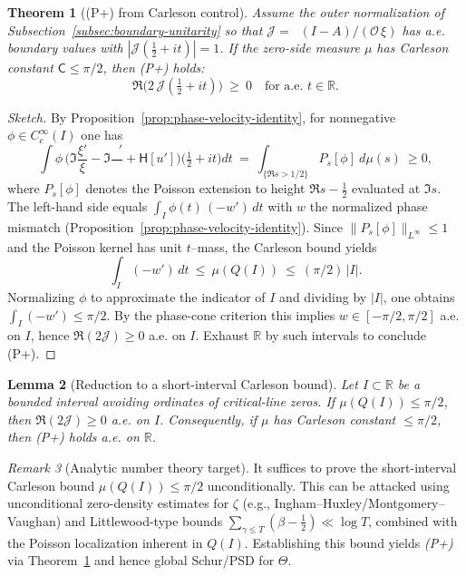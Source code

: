 \documentclass[11pt]{article}
\newtheorem{theorem}{Theorem}
\newtheorem{lemma}[theorem]{Lemma}
\theoremstyle{definition}
\theoremstyle{remark}
\newtheorem{remark}[theorem]{Remark}
\newcommand{\R}{\mathbb{R}}
\DeclareMathOperator{\dettwo}{det_2}
\begin{document}
\begin{theorem}[(P+) from Carleson control]\label{thm:Pplus-from-Carleson}
Assume the outer normalization of Subsection~\ref{subsec:boundary-unitarity} so that \(\mathcal J=\dettwo(I-A)/(\mathcal O\,\xi)\) has a.e. boundary values with \(|\mathcal J(\tfrac12+it)|=1\). If the zero-side measure \(\mu\) has Carleson constant \(\mathsf C\le \pi/2\), then \emph{(P+)} holds:
\[
 \Re\big(2\,\mathcal J(\tfrac12+it)\big)\ \ge\ 0\quad\text{for a.e. }t\in\R.
\]
\end{theorem}
\begin{proof}[Sketch]
By Proposition~\ref{prop:phase-velocity-identity}, for nonnegative \(\phi\in C_c^\infty(I)\) one has
\[
 \int\!\phi\,\Big(\Im\frac{\xi'}{\xi}-\Im\frac{\dettwo'}{\dettwo}+\mathsf H[u']\Big)\Big(\tfrac12+it\Big)dt\ =\ \int_{\{\Re s>1/2\}} P_{s}\![\phi] \ d\mu(s)\ \ge 0,
\]
where \(P_{s}[\phi]\) denotes the Poisson extension to height \(\Re s-\tfrac12\) evaluated at \(\Im s\). The left-hand side equals \(\int_I \phi(t)\,(-w')\,dt\) with \(w\) the normalized phase mismatch (Proposition~\ref{prop:phase-velocity-identity}). Since \(\|P_{s}[\phi]\|_{L^\infty}\le 1\) and the Poisson kernel has unit \(t\)–mass, the Carleson bound yields
\[
 \int_I (-w')\,dt\ \le\ \mu(Q(I))\ \le\ (\pi/2)\,|I|.
\]
Normalizing \(\phi\) to approximate the indicator of \(I\) and dividing by \(|I|\), one obtains \(\int_I (-w')\le \pi/2\). By the phase-cone criterion this implies \(w\in[-\pi/2,\pi/2]\) a.e. on \(I\), hence \(\Re(2\mathcal J)\ge 0\) a.e. on \(I\). Exhaust \(\R\) by such intervals to conclude (P+).
\end{proof}

\begin{lemma}[Reduction to a short-interval Carleson bound]\label{lem:HP-Carleson}
Let \(I\subset\R\) be a bounded interval avoiding ordinates of critical-line zeros. If \(\mu(Q(I))\le \pi/2\), then \(\Re(2\mathcal J)\ge 0\) a.e. on \(I\). Consequently, if \(\mu\) has Carleson constant \(\le \pi/2\), then \emph{(P+)} holds a.e. on \(\R\).
\end{lemma}
\begin{remark}[Analytic number theory target]
It suffices to prove the short-interval Carleson bound \(\mu(Q(I))\le \pi/2\) unconditionally. This can be attacked using unconditional zero-density estimates for \(\zeta\) (e.g., Ingham–Huxley/Montgomery–Vaughan) and Littlewood-type bounds \(\sum_{\gamma\le T}(\beta-\tfrac12)\ll \log T\), combined with the Poisson localization inherent in \(Q(I)\). Establishing this bound yields \emph{(P+)} via Theorem~\ref{thm:Pplus-from-Carleson} and hence global Schur/PSD for \(\Theta\).
\end{remark}
\end{document}
